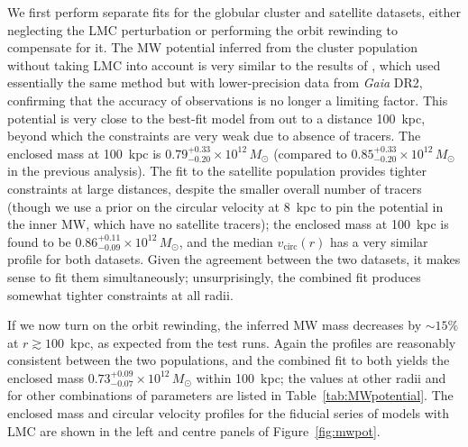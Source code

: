 \documentclass[usenatbib,fleqn]{mnras}
\newcommand{\Gaia}{\textit{Gaia}\xspace}
\begin{document}
We first perform separate fits for the globular cluster and satellite datasets, either neglecting the LMC perturbation or performing the orbit rewinding to compensate for it.
The MW potential inferred from the cluster population without taking LMC into account is very similar to the results of \citet{Vasiliev2019b}, which used essentially the same method but with lower-precision data from \Gaia DR2, confirming that the accuracy of observations is no longer a limiting factor. This potential is very close to the best-fit model from \citet{McMillan2017} out to a distance 100~kpc, beyond which the constraints are very weak due to absence of tracers.
The enclosed mass at 100~kpc is $0.79^{+0.33}_{-0.20}\times10^{12}\,M_\odot$ (compared to $0.85^{+0.33}_{-0.20}\times10^{12}\,M_\odot$ in the previous analysis). The fit to the satellite population provides tighter constraints at large distances, despite the smaller overall number of tracers (though we use a prior on the circular velocity at 8~kpc to pin the potential in the inner MW, which have no satellite tracers); the enclosed mass at 100~kpc is found to be $0.86^{+0.11}_{-0.09}\times10^{12}\,M_\odot$, and the median $v_\text{circ}(r)$ has a very similar profile for both datasets. Given the agreement between the two datasets, it makes sense to fit them simultaneously; unsurprisingly, the combined fit produces somewhat tighter constraints at all radii.

If we now turn on the orbit rewinding, the inferred MW mass decreases by $\sim 15\%$ at $r\gtrsim 100$~kpc, as expected from the test runs. Again the profiles are reasonably consistent between the two populations, and the combined fit to both yields the enclosed mass $0.73^{+0.09}_{-0.07}\times10^{12}\,M_\odot$ within 100~kpc; the values at other radii and for other combinations of parameters are listed in Table~\ref{tab:MWpotential}. The enclosed mass and circular velocity profiles for the fiducial series of models with LMC are shown in the left and centre panels of Figure~\ref{fig:mwpot}.
\end{document}
